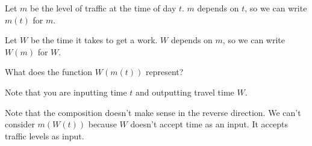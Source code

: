 \documentclass{ximera}
\begin{document}
\begin{question}
Let $m$ be the level of traffic at the time of day $t$. $m$ depends on $t$, so we can write $m(t)$ for $m$.

Let $W$ be the time it takes to get a work. $W$ depends on $m$, so we can write $W(m)$ for $W$.

What does the function $W(m(t))$ represent?
\begin{solution}
\begin{multiple-choice}
\end{multiple-choice}
\begin{hint}
Note that you are inputting time $t$ and outputting travel time $W$. 
\end{hint}

Note that the composition doesn't make sense in the reverse direction. We can't consider $m(W(t))$ because $W$ doesn't accept time as an input. It accepts traffic levels as input.
\end{solution}
\end{question}
\end{document}
